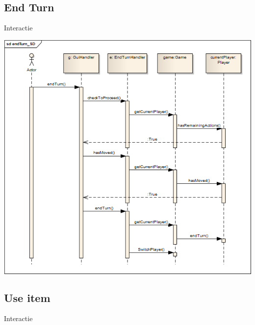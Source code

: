 \documentclass[t]{beamer}
\begin{document}
\subsection{End Turn}
\begin{frame}{Interactie}
\begin{multicols}{2}
\tableofcontents[currentsection]
\end{multicols}
\end{frame}

\begin{frame}[plain]
\begin{center}
\includegraphics[width= 0.90\linewidth]{../uml/endTurn_SD.png}
\end{center}
\end{frame}

\subsection{Use item}
\begin{frame}{Interactie}
\begin{multicols}{2}
\tableofcontents[currentsection]
\end{multicols}
\end{frame}
\end{document}
